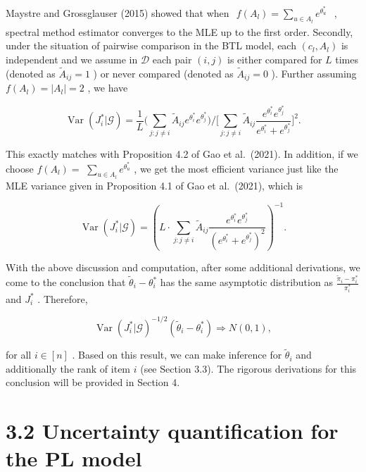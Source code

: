 Maystre and Grossglauser (2015) showed that when
\(\begin{array}{r}f(A_l) = \sum_{u\in A_l}e^{\theta_u^*} \end{array}\) ,
spectral method estimator converges to the MLE up to the first order.
Secondly, under the situation of pairwise comparison in the BTL model,
each \((c_l,A_l)\) is independent and we assume in \(\mathcal{D}\) each
pair \((i,j)\) is either compared for \(L\) times (denoted as
\(\widetilde{A}_{ij} = 1\) ) or never compared (denoted as
\(\widetilde{A}_{ij} = 0\) ). Further assuming
\(f(A_{l}) = |A_{l}| = 2\) , we have

\[
\operatorname {Var}(J_i^* |\mathcal{G}) = \frac{1}{L}\bigg(\sum_{j:j\neq i}\widetilde{A}_{ij}e^{\theta_i^*}e^{\theta_j^*}\bigg)\bigg / \bigg[\sum_{j:j\neq i}\widetilde{A}_{ij}\frac{e^{\theta_i^*}e^{\theta_j^*}}{e^{\theta_i^*} + e^{\theta_j^*}}\bigg]^2.
\]

This exactly matches with Proposition 4.2 of Gao et al.~(2021). In
addition, if we choose \(f(A_{l}) =\)
\(\textstyle \sum_{u\in A_l}e^{\theta_u^*}\) , we get the most efficient
variance just like the MLE variance given in Proposition 4.1 of Gao et
al.~(2021), which is

\[
\operatorname {Var}(J_i^* |\mathcal{G}) = \left(L\cdot \sum_{j:j\neq i}\widetilde{A}_{ij}\frac{e^{\theta_i^*}e^{\theta_j^*}}{(e^{\theta_i^*} + e^{\theta_j^*})^2}\right)^{-1}.
\]

With the above discussion and computation, after some additional
derivations, we come to the conclusion that
\(\widetilde{\theta}_{i} - \theta_{i}^{*}\) has the same asymptotic
distribution as
\(\frac{\widetilde{\pi}_{i} - \pi_{i}^{*}}{\pi_{i}^{*}}\) and
\(J_{i}^{*}\) . Therefore,

\[
\operatorname {Var}(J_i^* |\mathcal{G})^{-1 / 2}(\widetilde{\theta}_i - \theta_i^*)\Rightarrow N(0,1),
\]

for all \(i\in [n]\) . Based on this result, we can make inference for
\(\widetilde{\theta}_{i}\) and additionally the rank of item \(i\) (see
Section 3.3). The rigorous derivations for this conclusion will be
provided in Section 4.

\section{3.2 Uncertainty quantification for the PL
model}\label{uncertainty-quantification-for-the-pl-model}

